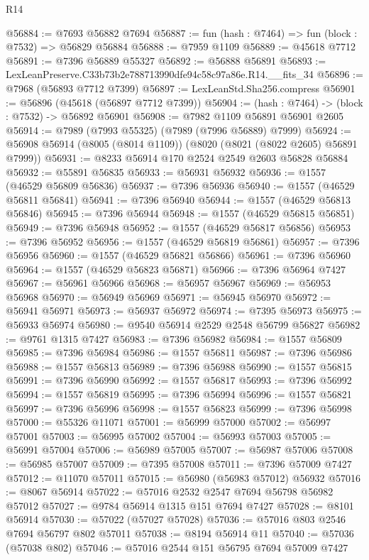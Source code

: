 \begin{lexlean}{R14}
\begin{coremodule}
@56884 := @7693 @56882 @7694
@56887 := fun (hash : @7464) => fun (block : @7532) => @56829 @56884
@56888 := @7959 @1109
@56889 := @45618 @7712
@56891 := @7396 @56889 @55327
@56892 := @56888 @56891
@56893 := LexLeanPreserve.C33b73b2e788713990dfe94c58c97a86e.R14.__fits_34
@56896 := @7968 (@56893 @7712 @7399)
@56897 := LexLeanStd.Sha256.compress
@56901 := @56896 (@45618 (@56897 @7712 @7399))
@56904 := (hash : @7464) -> (block : @7532) -> @56892 @56901
@56908 := @7982 @1109 @56891 @56901 @2605
@56914 := @7989 (@7993 @55325) (@7989 (@7996 @56889) @7999)
@56924 := @56908 @56914 (@8005 (@8014 @1109)) (@8020 (@8021 (@8022 @2605) @56891 @7999))
@56931 := @8233 @56914 @170 @2524 @2549 @2603 @56828 @56884
@56932 := @55891 @56835
@56933 := @56931 @56932
@56936 := @1557 (@46529 @56809 @56836)
@56937 := @7396 @56936
@56940 := @1557 (@46529 @56811 @56841)
@56941 := @7396 @56940
@56944 := @1557 (@46529 @56813 @56846)
@56945 := @7396 @56944
@56948 := @1557 (@46529 @56815 @56851)
@56949 := @7396 @56948
@56952 := @1557 (@46529 @56817 @56856)
@56953 := @7396 @56952
@56956 := @1557 (@46529 @56819 @56861)
@56957 := @7396 @56956
@56960 := @1557 (@46529 @56821 @56866)
@56961 := @7396 @56960
@56964 := @1557 (@46529 @56823 @56871)
@56966 := @7396 @56964 @7427
@56967 := @56961 @56966
@56968 := @56957 @56967
@56969 := @56953 @56968
@56970 := @56949 @56969
@56971 := @56945 @56970
@56972 := @56941 @56971
@56973 := @56937 @56972
@56974 := @7395 @56973
@56975 := @56933 @56974
@56980 := @9540 @56914 @2529 @2548 @56799 @56827
@56982 := @9761 @1315 @7427
@56983 := @7396 @56982
@56984 := @1557 @56809
@56985 := @7396 @56984
@56986 := @1557 @56811
@56987 := @7396 @56986
@56988 := @1557 @56813
@56989 := @7396 @56988
@56990 := @1557 @56815
@56991 := @7396 @56990
@56992 := @1557 @56817
@56993 := @7396 @56992
@56994 := @1557 @56819
@56995 := @7396 @56994
@56996 := @1557 @56821
@56997 := @7396 @56996
@56998 := @1557 @56823
@56999 := @7396 @56998
@57000 := @55326 @11071
@57001 := @56999 @57000
@57002 := @56997 @57001
@57003 := @56995 @57002
@57004 := @56993 @57003
@57005 := @56991 @57004
@57006 := @56989 @57005
@57007 := @56987 @57006
@57008 := @56985 @57007
@57009 := @7395 @57008
@57011 := @7396 @57009 @7427
@57012 := @11070 @57011
@57015 := @56980 (@56983 @57012) @56932
@57016 := @8067 @56914
@57022 := @57016 @2532 @2547 @7694 @56798 @56982 @57012
@57027 := @9784 @56914 @1315 @151 @7694 @7427
@57028 := @8101 @56914
@57030 := @57022 (@57027 @57028)
@57036 := @57016 @803 @2546 @7694 @56797 @802 @57011
@57038 := @8194 @56914 @11
@57040 := @57036 (@57038 @802)
@57046 := @57016 @2544 @151 @56795 @7694 @57009 @7427

\end{coremodule}
\end{lexlean}
